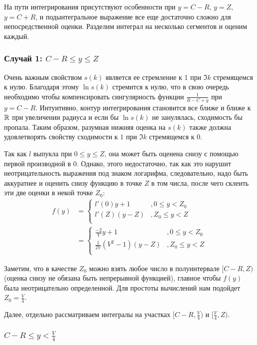 На пути интегрирования присутствуют особенности при $y = C - R$, $y = Z$, $y = C + R$, и подынтегральное выражение все еще достаточно сложно для непосредственной оценки. Разделим интеграл на несколько сегментов и оценим каждый.

\subsubsection{Случай 1: $C - R \le y \le Z$}
Очень важным свойством $s(k)$ является ее стремление к 1 при $\Im k$ стремящемся к нулю. Благодаря этому $\ln s(k)$ стремится к нулю, что в свою очередь необходимо чтобы компенсировать сингулярность функции $\frac{1}{R - C + y}$ при $y = C - R$. Интуитивно, контур интегрирования становится все ближе и ближе к $\mathbb{R}$ при увеличении радиуса и если бы $\ln s(k)$ не занулялась, сходимость бы пропала. Таким образом, разумная нижняя оценка на $s(k)$ также должна удовлетворять свойству сходимости к $1$ при $\Im k$ стремящемся к $0$.

Так как $l$ выпукла при $0 \le y \le Z$, она может быть оценена снизу с помощью первой производной в $0$. Однако, этого недостаточно, так как это нарушит неотрицательность выражения под знаком логарифма, следовательно, надо быть аккуратнее и оценить снизу функцию в точке $Z$ в том числа, после чего склеить эти две оценки в некой точке $Z_0$:
\begin{align*}
f(y)
& = 
\begin{cases}
l'(0) y + 1   &, 0 \le y < Z_0  \\
l'(Z) (y - Z) &, Z_0 \le y < Z \\
\end{cases}
\\
& =
\begin{cases}
\frac{-2}{V} y + 1   &, 0 \le y < Z_0  \\
\frac{1}{2 V}(V^2 - 1) (y - Z) &, Z_0 \le y < Z \\
\end{cases}
\end{align*}

Заметим, что в качестве $Z_0$ можно взять любое число в полуинтервале $[C-R, Z)$ (оценка снизу не обязана быть непрерывной функцией), главное чтобы $f(y)$ была неотрицательно определенной. Для простоты вычислений нам подойдет $Z_0 = \frac{V}{4}$. 

Далее, отдельно рассматриваем интегралы на участках $[C - R, \frac{V}{4})$ и $[\frac{V}{4}, Z)$.

\subsubsection{$C - R \le y < \frac{V}{4}$}

